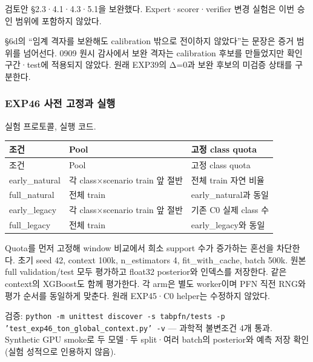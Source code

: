 \par\noindent \textbullet\enspace 검토안 §2.3·4.1·4.3·5.1을 보완했다. Expert·scorer·verifier 변경 실험은 이번 승인 범위에 포함하지 않았다.


\par\noindent \textbullet\enspace §6d의 “임계 격자를 보완해도 calibration 밖으로 전이하지 않았다”는 문장은 증거 범위를 넘어선다. 0909 원시 감사에서 보완 격자는 calibration 후보를 만들었지만 확인 구간·test에 적용되지 않았다. 원래 EXP39의 Δ=\allowbreak{}0과 보완 후보의 미검증 상태를 구분한다.


\subsubsection{EXP46 사전 고정과 실행}
실험 프로토콜, 실행 코드.

\begingroup
\footnotesize
\begin{longtable}{>{\raggedright\arraybackslash}p{}>{\raggedright\arraybackslash}p{}>{\raggedright\arraybackslash}p{}}
\toprule
조건 & Pool & 고정 class quota \\ \midrule
\endfirsthead
조건 & Pool & 고정 class quota \\ \midrule
\endhead
{}early\_\allowbreak{}natural & 각 class×scenario train 앞 절반 & 전체 train 자연 비율 \\
{}full\_\allowbreak{}natural & 전체 train & early\_\allowbreak{}natural과 동일 \\
{}early\_\allowbreak{}legacy & 각 class×scenario train 앞 절반 & 기존 C0 실제 class 수 \\
{}full\_\allowbreak{}legacy & 전체 train & early\_\allowbreak{}legacy와 동일 \\
\bottomrule
\end{longtable}
\endgroup
Quota를 먼저 고정해 window 비교에서 희소 support 수가 증가하는 혼선을 차단한다. 초기 seed 42, context 100k, n\_\allowbreak{}estimators 4, fit\_\allowbreak{}with\_\allowbreak{}cache, batch 500k. 원본 full validation/\allowbreak{}test 모두 평가하고 float32 posterior와 인덱스를 저장한다. 같은 context의 XGBoost도 함께 평가한다. 각 arm은 별도 worker이며 PFN 직전 RNG와 평가 순서를 동일하게 맞춘다. 원래 EXP45·C0 helper는 수정하지 않았다.

\par\noindent \textbullet\enspace 검증: \texttt{python -\allowbreak{}m unitte\allowbreak{}st disco\allowbreak{}ver -\allowbreak{}s t\allowbreak{}abpfn/\allowbreak{}\allowbreak{}te\allowbreak{}sts -\allowbreak{}p '\allowbreak{}test\_\allowbreak{}\allowbreak{}exp\allowbreak{}46\_\allowbreak{}\allowbreak{}ton\_\allowbreak{}\allowbreak{}g\allowbreak{}lobal\_\allowbreak{}\allowbreak{}co\allowbreak{}ntext.\allowbreak{}py\allowbreak{}' -\allowbreak{}v} — 과학적 불변조건 4개 통과. Synthetic GPU smoke로 두 모델·두 split·여러 batch의 posterior와 예측 저장 확인(실험 성적으로 인용하지 않음).


